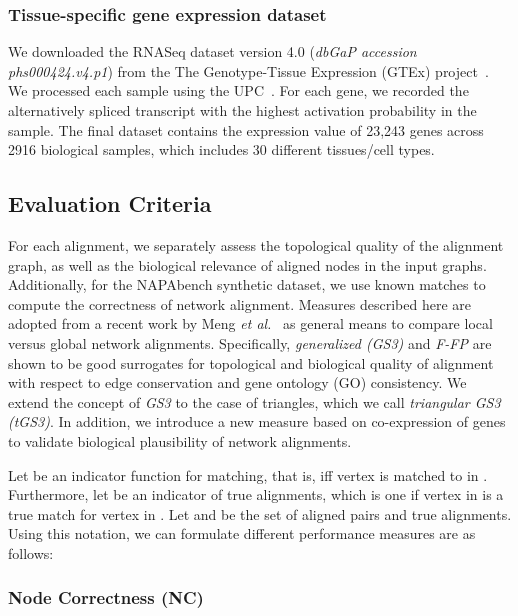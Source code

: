 \documentclass[10pt, journal, compsoc, final]{IEEEtran}
\begin{document}
\subsubsection{Tissue-specific gene expression dataset}

We downloaded the RNASeq dataset version 4.0 (\textit{dbGaP accession phs000424.v4.p1}) from the The Genotype-Tissue Expression (GTEx) project~\cite{Ardlie2015}. We processed each sample using the UPC~\cite{Piccolo2013}. For each gene, we recorded the alternatively spliced transcript with the highest activation probability in the sample. The final dataset contains the expression value of 23,243 genes across 2916 biological samples, which includes 30 different tissues/cell types.







\subsection{Evaluation Criteria}
\label{sec:eval_criteria}

For each alignment, we separately assess the topological quality of the alignment graph, as well as
the biological relevance of aligned nodes in the input graphs.  Additionally, for the NAPAbench synthetic dataset, we use known matches to compute the correctness of network alignment. Measures described here are adopted from a recent work by Meng \textit{et al.}~\cite{Meng2015} as general means to compare local versus global network alignments. Specifically, \textit{generalized  (GS3)} and \textit{F-FP} are shown to be good surrogates for topological and biological quality of alignment with respect to edge conservation and gene ontology (GO) consistency.
We extend the concept of \textit{GS3} to the case of triangles, which we call \textit{triangular GS3 (tGS3)}. In addition, we introduce a new measure based on co-expression of genes to validate biological plausibility of network alignments. 


Let  be an indicator function for matching, that is,  iff vertex  is matched to  in . Furthermore, let  be an indicator of true alignments, which is one if vertex  in  is a true match for vertex  in . Let  and  be the set of aligned pairs and true alignments. Using this notation, we can formulate different performance measures are as follows:


\subsubsection{Node Correctness (NC)}
\end{document}
